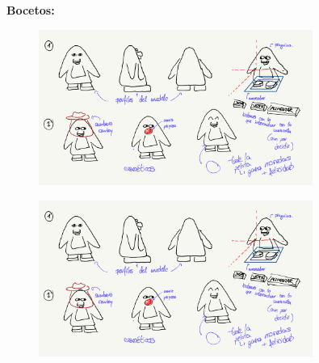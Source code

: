 \documentclass{article}
\begin{document}
\newpage
\textbf{Bocetos:}
\begin{figure}[htbp]
	\centering
	\includegraphics[width=0.8\textwidth]{./images/Boceto1.png}
	\label{fig:boceto1}
\end{figure}

\begin{figure}[htbp]
	\centering
	\includegraphics[width=0.8\textwidth]{./images/Boceto1.png}
	\label{fig:boceto2}
\end{figure}




  
  
  
\pagebreak



\clearpage
\end{document}
